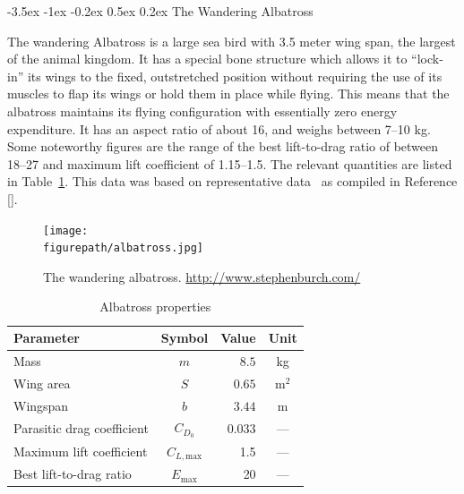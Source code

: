 \documentclass[11pt,letterpaper,onecolumn]{article}
\makeatletter
\newcommand{\figurepath}{../fig/term-project}
\renewcommand\subsection{\@startsection{subsection}{1}{\z@}%
 {-3.5ex \@plus-1ex \@minus-0.2ex}%
 {0.5ex \@plus0.2ex}%
 {\fontsize{10pt}{10pt}\selectfont\bfseries\sffamily}}
\makeatother
\begin{document}
\subsection{The Wandering Albatross}

The wandering Albatross is a large sea bird with 3.5 meter wing span, the largest of the animal kingdom.
It has a special bone structure which allows it to ``lock-in'' its wings to the fixed, outstretched position without requiring the use of its muscles to flap its wings or hold them in place while flying.
This means that the albatross maintains its flying configuration with essentially zero energy expenditure.
It has an aspect ratio of about 16, and weighs between 7--10 kg.
Some noteworthy figures are the range of the best lift-to-drag ratio of between 18--27\cite{barnes.howflies.2004,alexander.naturesflyers.2004,denny.dynamicsoaring.2009} and maximum lift coefficient of 1.15--1.5\cite{pennycuick.glidingpetrel.1960,wood.flight.1973,pennycuick.flight.1982}.
The relevant quantities are listed in Table~\ref{tab.albatrossdata}.
This data was based on representative data~\cite{tucker.falconaero.1970,wood.flight.1973,pennycuick.flight.1982} as compiled in Reference [].

\begin{figure}[h]
  \begin{center}
    \texttt{[image: \\figurepath/albatross.jpg]}
    \caption{The wandering albatross. \url{http://www.stephenburch.com/}\label{fig:part3_multiple_state}}
  \end{center}
\end{figure}

\begin{table}[H]
  \centering
  \caption{Albatross properties}
  \begin{tabular}{lcrc}
    \toprule
    Parameter                   & Symbol              & Value   & Unit \\ \midrule
    Mass                        & $m$                 & $8.5$   & kg \\
    Wing area                   & $S$                 & $0.65$  & m$^{2}$ \\
    Wingspan                    & $b$                 & $3.44$  & m \\
    Parasitic drag coefficient  & $C_{D_{0}}$         & 0.033   & --- \\
    Maximum lift coefficient    & $C_{L,\text{max}}$  & 1.5     & --- \\
    Best lift-to-drag ratio     & $E_{\text{max}}$    & 20      & --- \\
    \bottomrule
  \end{tabular}\label{tab.albatrossdata}
\end{table}
\end{document}
